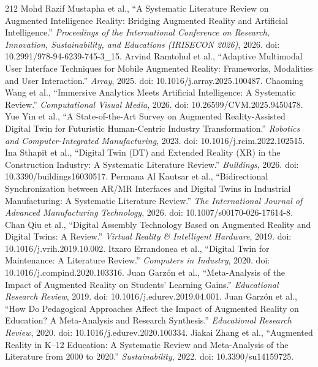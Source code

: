 \begin{thebibliography}{212}
 Mohd Razif Mustapha et al., ``A Systematic Literature Review on Augmented Intelligence Reality: Bridging Augmented Reality and Artificial Intelligence.'' \emph{Proceedings of the International Conference on Research, Innovation, Sustainability, and Educations (IRISECON 2026)}, 2026. doi: 10.2991/978-94-6239-745-3_15.
 Arvind Ramtohul et al., ``Adaptive Multimodal User Interface Techniques for Mobile Augmented Reality: Frameworks, Modalities and User Interaction.'' \emph{Array}, 2025. doi: 10.1016/j.array.2025.100487.
 Chaoming Wang et al., ``Immersive Analytics Meets Artificial Intelligence: A Systematic Review.'' \emph{Computational Visual Media}, 2026. doi: 10.26599/CVM.2025.9450478.
 Yue Yin et al., ``A State-of-the-Art Survey on Augmented Reality-Assisted Digital Twin for Futuristic Human-Centric Industry Transformation.'' \emph{Robotics and Computer-Integrated Manufacturing}, 2023. doi: 10.1016/j.rcim.2022.102515.
 Ina Sthapit et al., ``Digital Twin ({DT}) and Extended Reality ({XR}) in the Construction Industry: A Systematic Literature Review.'' \emph{Buildings}, 2026. doi: 10.3390/buildings16030517.
 Permana Al Kautsar et al., ``Bidirectional Synchronization between {AR/MR} Interfaces and Digital Twins in Industrial Manufacturing: A Systematic Literature Review.'' \emph{The International Journal of Advanced Manufacturing Technology}, 2026. doi: 10.1007/s00170-026-17614-8.
 Chan Qiu et al., ``Digital Assembly Technology Based on Augmented Reality and Digital Twins: A Review.'' \emph{Virtual Reality \& Intelligent Hardware}, 2019. doi: 10.1016/j.vrih.2019.10.002.
 Itxaro Errandonea et al., ``Digital Twin for Maintenance: A Literature Review.'' \emph{Computers in Industry}, 2020. doi: 10.1016/j.compind.2020.103316.
 Juan Garz{\'o}n et al., ``Meta-Analysis of the Impact of Augmented Reality on Students' Learning Gains.'' \emph{Educational Research Review}, 2019. doi: 10.1016/j.edurev.2019.04.001.
 Juan Garz{\'o}n et al., ``How Do Pedagogical Approaches Affect the Impact of Augmented Reality on Education? A Meta-Analysis and Research Synthesis.'' \emph{Educational Research Review}, 2020. doi: 10.1016/j.edurev.2020.100334.
 Jiakai Zhang et al., ``Augmented Reality in {K--12} Education: A Systematic Review and Meta-Analysis of the Literature from 2000 to 2020.'' \emph{Sustainability}, 2022. doi: 10.3390/su14159725.

\end{thebibliography}
